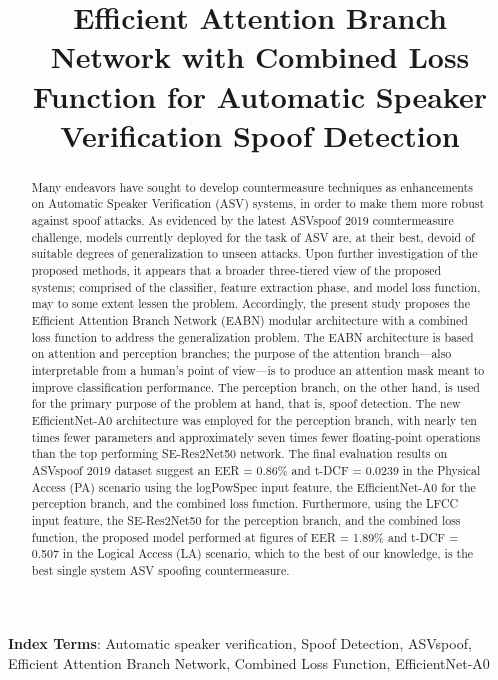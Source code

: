 \documentclass[a4paper]{article}
\title{Efficient Attention Branch Network with Combined Loss Function for Automatic Speaker Verification Spoof Detection}
\begin{document}
\maketitle
\begin{abstract}
  Many endeavors have sought to develop countermeasure techniques as enhancements on Automatic Speaker Verification (ASV) systems, in order to make them more robust against spoof attacks. As evidenced by the latest ASVspoof 2019 countermeasure challenge, models currently deployed for the task of ASV are, at their best, devoid of suitable degrees of generalization to unseen attacks. Upon further investigation of the proposed methods, it appears that a broader three-tiered view of the proposed systems; comprised of the classifier, feature extraction phase, and model loss function, may to some extent lessen the problem. Accordingly, the present study proposes the Efficient Attention Branch Network (EABN) modular architecture with a combined loss function to address the generalization problem. The EABN architecture is based on attention and perception branches; the purpose of the attention branch—also interpretable from a human’s point of view—is to produce an attention mask meant to improve classification performance. The perception branch, on the other hand, is used for the primary purpose of the problem at hand, that is, spoof detection. The new EfficientNet-A0 architecture was employed for the perception branch, with nearly ten times fewer parameters and approximately seven times fewer floating-point operations than the top performing SE-Res2Net50 network. The final evaluation results on ASVspoof 2019 dataset suggest an EER = 0.86\% and t-DCF = 0.0239 in the Physical Access (PA) scenario using the logPowSpec input feature, the EfficientNet-A0 for the perception branch, and the combined loss function. Furthermore, using the LFCC input feature, the SE-Res2Net50 for the perception branch, and the combined loss function, the proposed model performed at figures of EER = 1.89\% and t-DCF = 0.507 in the Logical Access (LA) scenario, which to the best of our knowledge, is the best single system ASV spoofing countermeasure. 
\end{abstract}
\noindent\textbf{Index Terms}: Automatic speaker verification, Spoof Detection, ASVspoof, Efficient Attention Branch Network, Combined Loss Function, EfficientNet-A0
\end{document}
